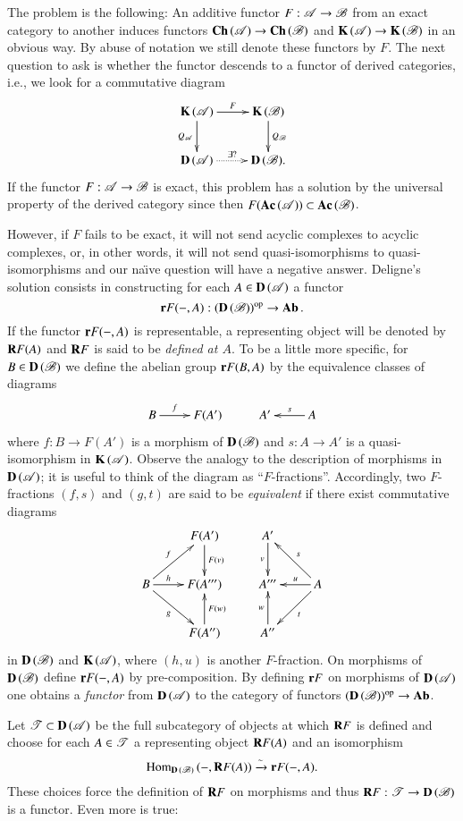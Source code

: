\documentclass[1p]{elsarticle}
\theoremstyle{mythm}
\theoremstyle{mydef}
\begin{document}
The problem is the following: An additive functor $F: \operatorname{\mathscr{A}} \to
\operatorname{\mathscr{B}}$ from an exact category to another induces functors
$\operatorname{\mathbf{Ch}}{(\operatorname{\mathscr{A}})} \to \operatorname{\mathbf{Ch}}{(\operatorname{\mathscr{B}})}$ and $\operatorname{\mathbf{K}}{(\operatorname{\mathscr{A}})} \to \operatorname{\mathbf{K}}{(\operatorname{\mathscr{B}})}$ in
an obvious way. By abuse of notation we still denote these functors by
$F$. The next question to ask is whether the functor descends to a
functor of derived categories, i.e., we look for a commutative diagram
\[
\xymatrix{
  \K{(\scrA)} \ar[d]_{Q_{\scrA}} \ar[r]^-{F} & 
  \K{(\scrB)} \ar[d]^{Q_{\scrB}} \\
  \D{(\scrA)} \ar@{.>}[r]^-{\exists ?} & \D{(\scrB)}.
}
\]
If the functor $F: \operatorname{\mathscr{A}} \to \operatorname{\mathscr{B}}$
is exact, this problem has a solution by the
universal property of the derived category since then $F(\operatorname{\mathbf{Ac}}{(\operatorname{\mathscr{A}})})
\subset \operatorname{\mathbf{Ac}}{(\operatorname{\mathscr{B}})}$.

However, if $F$ fails to be exact, it will not send acyclic complexes to
acyclic complexes, or, in other words, it will not send
quasi-isomorphisms to quasi-isomorphisms and our na\"\i{}ve question
will have a negative answer. Deligne's solution consists in
constructing for each $A \in \operatorname{\mathbf{D}}{(\operatorname{\mathscr{A}})}$ a functor
\[
\operatorname{\mathbf{r}}\!{F}({-},A) : (\operatorname{\mathbf{D}}{(\operatorname{\mathscr{B}})})^{\operatorname{op}} \to \operatorname{\mathbf{Ab}}.
\]
If the functor $\operatorname{\mathbf{r}}\!{F}({-},A)$ is representable, a representing
object will be denoted by $\operatorname{\mathbf{R}}\!{F}(A)$ and $\operatorname{\mathbf{R}}\!{F}$ is said to be 
\emph{defined at $A$}. 
To be a little more specific, for $B \in \operatorname{\mathbf{D}}{(\operatorname{\mathscr{B}})}$ we
define the abelian group $\operatorname{\mathbf{r}}\!{F}(B,A)$ by the equivalence classes of diagrams
\[
\xymatrix{
  B \ar[r]^-{f} & F(A') & A' & A \ar[l]_-{s}
}
\]
where $f:B \to F(A')$ is a morphism of $\operatorname{\mathbf{D}}{(\operatorname{\mathscr{B}})}$ and $s:A \to A'$ is a
quasi-isomorphism in $\operatorname{\mathbf{K}}{(\operatorname{\mathscr{A}})}$. Observe the analogy to the
description of morphisms in $\operatorname{\mathbf{D}}{(\operatorname{\mathscr{A}})}$; it is useful to think of
the diagram as ``$F$-fractions''. Accordingly, two $F$-fractions $(f,s)$ and
$(g,t)$ are said to be \emph{equivalent} if there exist commutative diagrams
\[
\xymatrix{
    & F(A') \ar[d]^-{F(v)} & A' \ar[d]_-{v}  \\
  B \ar[ur]^-{f} \ar[r]^-{h} \ar[dr]_-{g} & F(A''') & A''' &
  A \ar[ul]_-{s} \ar[l]_-{u} \ar[dl]^-{t} \\
  & F(A'') \ar[u]_-{F(w)} & A'' \ar[u]^-{w}
}
\]
in $\operatorname{\mathbf{D}}{(\operatorname{\mathscr{B}})}$ and $\operatorname{\mathbf{K}}{(\operatorname{\mathscr{A}})}$,
where $(h,u)$ is another $F$-fraction. On morphisms of $\operatorname{\mathbf{D}}{(\operatorname{\mathscr{B}})}$
define $\operatorname{\mathbf{r}}\!F{(-,A)}$ by pre-composition. By defining
$\operatorname{\mathbf{r}}\!F$ on morphisms of $\operatorname{\mathbf{D}}{(\operatorname{\mathscr{A}})}$ one obtains a \emph{functor} from
$\operatorname{\mathbf{D}}{(\operatorname{\mathscr{A}})}$ to the category of functors
$(\operatorname{\mathbf{D}}{(\operatorname{\mathscr{B}})})^{\operatorname{op}} \to \operatorname{\mathbf{Ab}}$. 

Let $\operatorname{\mathscr{T}} \subset \operatorname{\mathbf{D}}{(\operatorname{\mathscr{A}})}$
be the full subcategory of objects at which $\operatorname{\mathbf{R}}\!{F}$ is defined and
choose for each $A \in \operatorname{\mathscr{T}}$ a representing object $\operatorname{\mathbf{R}}\!F(A)$ and
an isomorphism 
\[
\operatorname{Hom}_{\operatorname{\mathbf{D}}{(\operatorname{\mathscr{B}})}}{({-}, \operatorname{\mathbf{R}}\!F(A))} \xrightarrow{\sim}
\operatorname{\mathbf{r}}\!F{({-},A)}.
\]
These choices force the definition of $\operatorname{\mathbf{R}}\!F$ on morphisms and thus
$\operatorname{\mathbf{R}}\!F: \operatorname{\mathscr{T}} \to \operatorname{\mathbf{D}}{(\operatorname{\mathscr{B}})}$ is a functor. Even
more is true:
\end{document}
